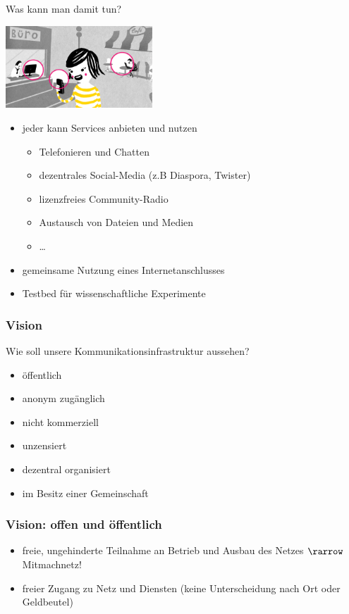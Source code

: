 \documentclass[handout]{beamer}
\begin{document}
\begin{frame}{Was kann man damit tun?}
	\vfill
	\begin{center}
		\includegraphics[width=5.5cm]{images/verbindet}
	\end{center}
	
	\begin{itemize}[<+->]
		\item jeder kann Services anbieten und nutzen
		\begin{itemize}
			\item Telefonieren und Chatten
			\item dezentrales Social-Media (z.B Diaspora, Twister)
			\item lizenzfreies Community-Radio
			\item Austausch von Dateien und Medien
			\item \ldots
		\end{itemize}
		\item gemeinsame Nutzung eines Internetanschlusses
		\item Testbed f\"ur wissenschaftliche Experimente
	\end{itemize}
	\vfill
\end{frame}

\begin{frame}
	\frametitle{Vision}
	
	Wie soll unsere Kommunikationsinfrastruktur aussehen?
	
	\begin{itemize}[<+->]
		\item öffentlich
		\item anonym zugänglich
		\item nicht kommerziell
		\item unzensiert
		\item dezentral organisiert
		\item im Besitz einer Gemeinschaft
	\end{itemize}
\end{frame}

\begin{frame}
	\frametitle{Vision: offen und öffentlich}
	
	\begin{itemize}[<+->]
		\item freie, ungehinderte Teilnahme an Betrieb und Ausbau des Netzes $\rarrow$ Mitmachnetz!
		\item freier Zugang zu Netz und Diensten (keine Unterscheidung nach Ort oder Geldbeutel)
	\end{itemize}
\end{frame}
\end{document}
